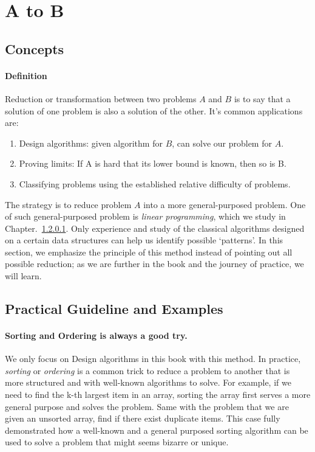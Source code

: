 \documentclass[../main.tex]{subfiles}
\begin{document}
\section{A to B}
\label{chapter_reduce_conquer_sec_a_b}
\subsection{Concepts}
\paragraph{Definition}
Reduction or transformation between two problems $A$ and $B$ is to say that a solution of one problem is also a solution of the other. It's common applications are:
\begin{enumerate}
    \item Design algorithms: given algorithm for $B$, can solve our problem for $A$.
    \item Proving limits: If A is hard that its lower bound is known, then so is B.
    \item Classifying problems using the established relative difficulty of problems.
\end{enumerate}
The strategy is to reduce problem $A$ into a more general-purposed problem. One of such general-purposed problem is \textit{linear programming}, which we study in Chapter.~\ref{}. Only experience and study of the classical algorithms designed on a certain data structures can help us identify possible `patterns'. In this section, we emphasize the principle of this method instead of pointing out all possible reduction; as we are further in the book and the journey of practice, we will learn.


\subsection{Practical Guideline and Examples}
\paragraph{Sorting and Ordering is always a good try.}
We only focus on Design algorithms in this book with this method. In practice, \textit{sorting} or \textit{ordering} is a common trick to reduce a problem to another that is more structured and with well-known algorithms to solve.  For example, if we need to find the k-th largest item in an array, sorting the array first serves a more general purpose and solves the problem. Same with the problem that we are given an unsorted array, find if there exist duplicate items. This case fully demonstrated how a well-known and a general purposed sorting algorithm can be used to solve a problem that might seems bizarre or unique. 
\end{document}
